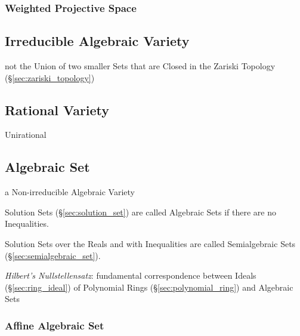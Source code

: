 \subsubsection{Weighted Projective Space}\label{sec:weighted_projective_space}



\subsection{Irreducible Algebraic Variety}
\label{sec:irreducible_algebraic_variety}

not the Union of two smaller Sets that are Closed in the Zariski Topology
(\S\ref{sec:zariski_topology})



\subsection{Rational Variety}\label{sec:rational_variety}

Unirational



\subsection{Algebraic Set}\label{sec:algebraic_set}

a Non-irreducible Algebraic Variety

Solution Sets (\S\ref{sec:solution_set}) are called Algebraic Sets if there are
no Inequalities.

Solution Sets over the Reals and with Inequalities are called Semialgebraic
Sets (\S\ref{sec:semialgebraic_set}).

\emph{Hilbert's Nullstellensatz}: fundamental correspondence between Ideals
(\S\ref{sec:ring_ideal}) of Polynomial Rings (\S\ref{sec:polynomial_ring}) and
Algebraic Sets



\subsubsection{Affine Algebraic Set}\label{sec:affine_algebraic_set}

